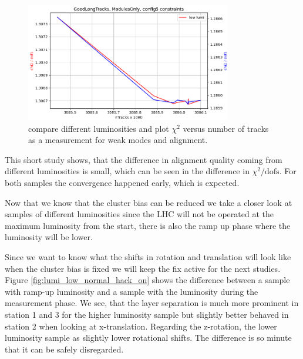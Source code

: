 \begin{figure}
  \centering
  \includegraphics[width=0.8\textwidth]{plots/jan_17_2022/chi2_tracks_modulesOnly.png}
  \caption{compare different luminosities and plot $\chi^2$ versus number of tracks as a measurement for weak modes and alignment.}
  \label{fig:chi2tracks_lumi_normal}
\end{figure}

This short study shows, that the difference in alignment quality coming from different luminosities is small, which can be seen in the difference in $\chi^2 / \text{dofs}$. For both samples the convergence happened early, which is expected.

Now that we know that the cluster bias can be reduced we take a closer look at samples of different luminosities since the LHC will not be operated at the maximum luminosity from the start, there is also the ramp up phase where the luminosity will be lower.

Since we want to know what the shifts in rotation and translation will look like when the cluster bias is fixed we will keep the fix active for the next studies.
Figure \ref{fig:lumi_low_normal_hack_on} shows the difference between a sample with ramp-up luminosity and a sample with the luminosity during the measurement phase.
We see, that the layer separation is much more prominent in station 1 and 3 for the higher luminosity sample but slightly better behaved in station 2 when looking at x-translation.
Regarding the z-rotation, the lower luminosity sample as slightly lower rotational shifts.
The difference is so minute that it can be safely disregarded.

